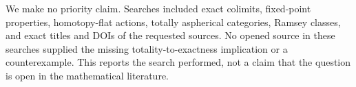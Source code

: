 We make no priority claim. Searches included exact colimits,
fixed-point properties, homotopy-flat actions, totally aspherical
categories, Ramsey classes, and exact titles and DOIs of the
requested sources. No opened source in these searches supplied
the missing totality-to-exactness implication or a counterexample.
This reports the search performed, not a claim that the question
is open in the mathematical literature.
